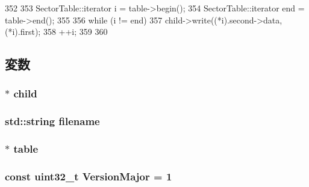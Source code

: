 \begin{DoxyCode}
352 {
353     SectorTable::iterator i = table->begin();
354     SectorTable::iterator end = table->end();
355 
356     while (i != end) {
357         child->write((*i).second->data, (*i).first);
358         ++i;
359     }
360 }
\end{DoxyCode}


\subsection{変数}
\hypertarget{classCowDiskImage_a3053e924a69d07b168217ad41e6b877b}{
\subsubsection[{child}]{$\ast$ {\bf child}}}
\label{classCowDiskImage_a3053e924a69d07b168217ad41e6b877b}
\hypertarget{classCowDiskImage_ae80f820219e45772366a2a68de6a54c4}{
\subsubsection[{filename}]{\setlength{\rightskip}{0pt plus 5cm}std::string {\bf filename}}}
\label{classCowDiskImage_ae80f820219e45772366a2a68de6a54c4}
\hypertarget{classCowDiskImage_a98c079cb623ba6bc8bf495e981e80c43}{
\subsubsection[{table}]{$\ast$ {\bf table}}}
\label{classCowDiskImage_a98c079cb623ba6bc8bf495e981e80c43}
\hypertarget{classCowDiskImage_aea9111b09377b8ceea1a83f731859e94}{
\subsubsection[{VersionMajor}]{\setlength{\rightskip}{0pt plus 5cm}const {\bf uint32\_\-t} {\bf VersionMajor} = 1}}
